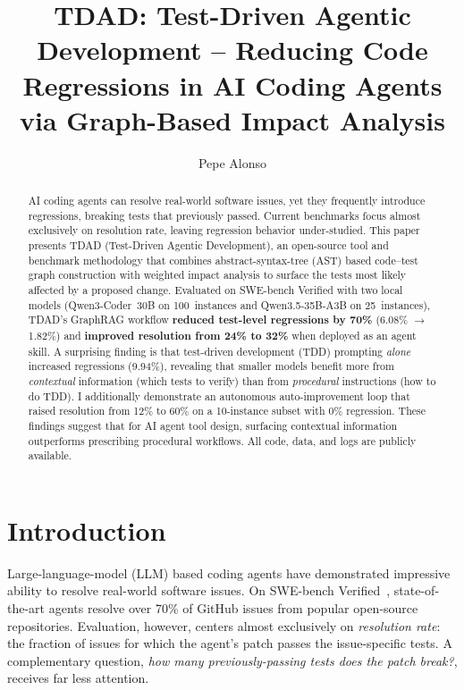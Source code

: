 \documentclass[sigconf,nonacm]{acmart}
\begin{document}
\title{TDAD: Test-Driven Agentic Development -- Reducing Code Regressions
  in AI Coding Agents via Graph-Based Impact Analysis}

\author{Pepe Alonso}

\begin{abstract}
AI coding agents can resolve real-world software issues, yet they frequently
introduce regressions, breaking tests that previously passed.  Current
benchmarks focus almost exclusively on resolution rate, leaving regression
behavior under-studied.  This paper presents \textsc{TDAD} (Test-Driven Agentic
Development), an open-source tool and benchmark methodology that combines
abstract-syntax-tree (AST) based code--test graph construction with weighted impact analysis to
surface the tests most likely affected by a proposed change.  Evaluated on
SWE-bench Verified with two local models (Qwen3-Coder~30B on 100~instances
and Qwen3.5-35B-A3B on 25~instances), \textsc{TDAD}'s GraphRAG workflow
\textbf{reduced test-level regressions by 70\%} (6.08\% $\to$ 1.82\%) and
\textbf{improved resolution from 24\% to 32\%} when deployed as an
agent skill.  A surprising finding is that test-driven development (TDD) prompting \emph{alone}
increased regressions (9.94\%), revealing that smaller models benefit more
from \emph{contextual} information (which tests to verify) than from
\emph{procedural} instructions (how to do TDD).  I additionally demonstrate
an autonomous auto-improvement loop that raised resolution from 12\% to 60\%
on a 10-instance subset with 0\% regression.  These findings
suggest that for AI agent tool design, surfacing contextual information
outperforms prescribing procedural workflows.  All code, data, and logs are
publicly available.
\end{abstract}


\maketitle

\section{Introduction}
\label{sec:intro}

Large-language-model (LLM) based coding agents have demonstrated impressive
ability to resolve real-world software issues.  On SWE-bench
Verified~\cite{jimenez2024swebench}, state-of-the-art agents resolve over 70\%
of GitHub issues from popular open-source repositories.  Evaluation, however,
centers almost exclusively on \emph{resolution rate}: the fraction of issues
for which the agent's patch passes the issue-specific tests.  A complementary
question, \emph{how many previously-passing tests does the patch
break?}, receives far less attention.
\end{document}
